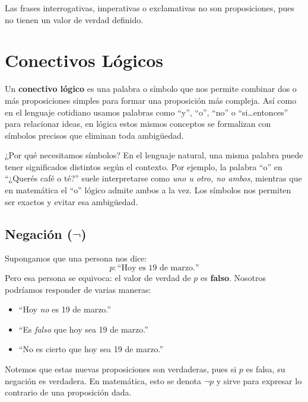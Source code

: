 \noindent Las frases interrogativas, imperativas o exclamativas no son proposiciones, pues no tienen un valor de verdad definido.

\section{\texorpdfstring{Conectivos Lógicos}{Conectivos Logicos}}

Un \textbf{conectivo lógico} es una palabra o símbolo que nos permite combinar dos o más proposiciones simples para formar una proposición más compleja. Así como en el lenguaje cotidiano usamos palabras como ``y'', ``o'', ``no'' o ``si\ldots entonces'' para relacionar ideas, en lógica estos mismos conceptos se formalizan con símbolos precisos que eliminan toda ambigüedad.

\begin{obs}{¿Por qué necesitamos símbolos?}
    En el lenguaje natural, una misma palabra puede tener significados distintos según el contexto. Por ejemplo, la palabra ``o'' en ``¿Querés café o té?'' suele interpretarse como \emph{uno u otro, no ambos}, mientras que en matemática el ``o'' lógico admite ambos a la vez. Los símbolos nos permiten ser exactos y evitar esa ambigüedad.
\end{obs}

\subsection{\texorpdfstring{Negación ($\lnot$)}{Negacion}}

Supongamos que una persona nos dice:
\[
p : \text{``Hoy es 19 de marzo.''}
\]
Pero esa persona se equivoca: el valor de verdad de $p$ es \textbf{falso}. Nosotros podríamos responder de varias maneras:

\begin{itemize}
    \item ``Hoy \emph{no} es 19 de marzo.''
    \item ``Es \emph{falso} que hoy sea 19 de marzo.''
    \item ``No es cierto que hoy sea 19 de marzo.''
\end{itemize}

\noindent Notemos que estas nuevas proposiciones son verdaderas, pues si $p$ es falsa, su negación es verdadera. En matemática, esto se denota $\lnot p$ y sirve para expresar lo contrario de una proposición dada.

